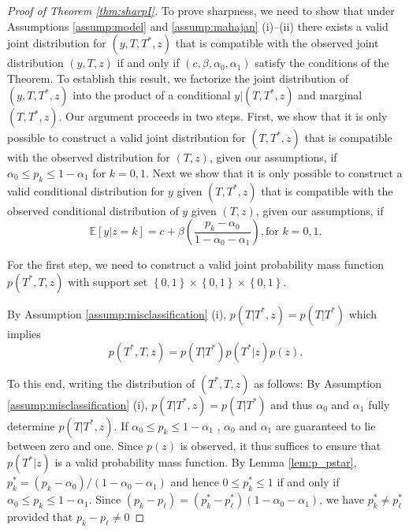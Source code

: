 \begin{proof}[Proof of Theorem \ref{thm:sharpI}]
  To prove sharpness, we need to show that under Assumptions \ref{assump:model} and \ref{assump:mahajan} (i)--(ii) there exists a valid joint distribution for $(y,T,T^*,z)$ that is compatible with the observed joint distribution $(y,T,z)$ if and only if $(c, \beta, \alpha_0, \alpha_1)$ satisfy the conditions of the Theorem.
To establish this result, we factorize the joint distribution of $(y,T,T^*,z)$ into the product of a conditional $y|(T,T^*,z)$ and marginal $(T,T^*,z)$.
Our argument proceeds in two steps.
First, we show that it is only possible to construct a valid joint distribution for $(T,T^*,z)$ that is compatible with the observed distribution for $(T,z)$, given our assumptions, if $\alpha_0 \leq p_k \leq 1 - \alpha_1$ for $k = 0,1$.
Next we show that it is only possible to construct a valid conditional distribution for $y$ given $(T,T^*,z)$ that is compatible with the observed conditional distribution of $y$ given $(T,z)$, given our assumptions, if 
  \[
    \mathbb{E}[y|z=k] = c + \beta \left( \frac{p_k - \alpha_0}{1 - \alpha_0 - \alpha_1} \right), \mbox{for } k = 0,1.
  \]

  For the first step, we need to construct a valid joint probability mass function $p(T^*,T,z)$ with support set $\left\{ 0,1 \right\} \times \left\{ 0,1 \right\} \times \left\{ 0,1 \right\}$.

 By Assumption \ref{assump:misclassification} (i), $p(T|T^*,z) = p(T|T^*)$ which implies
\[
  p(T^*,T,z) = p(T|T^*)p(T^*|z)p(z).
\]
 
 To this end, writing the distribution of $(T^*,T,z)$ as follows:
By Assumption \ref{assump:misclassification} (i), $p(T|T^*,z) = p(T|T^*)$ and thus $\alpha_0$ and $\alpha_1$ fully determine $p(T|T^*,z)$.  
If $\alpha_0 \leq p_k \leq 1 - \alpha_1$ , $\alpha_0$ and $\alpha_1$ are guaranteed to lie between zero and one.
Since $p(z)$ is observed, it thus suffices to ensure that $p(T^*|z)$ is a valid probability mass function.
By Lemma \ref{lem:p_pstar}, $p_k^* = (p_k - \alpha_0) / (1 - \alpha_0 - \alpha_1)$ and hence $0 \leq p_k^* \leq 1$ if and only if $\alpha_0 \leq p_k \leq 1 - \alpha_1$.
Since $(p_k - p_\ell) = (p_k^* - p_\ell^*)(1 - \alpha_0 - \alpha_1)$, we have $p^*_k \neq p^*_\ell$ provided that $p_k - p_\ell \neq 0$ 


\end{proof}
